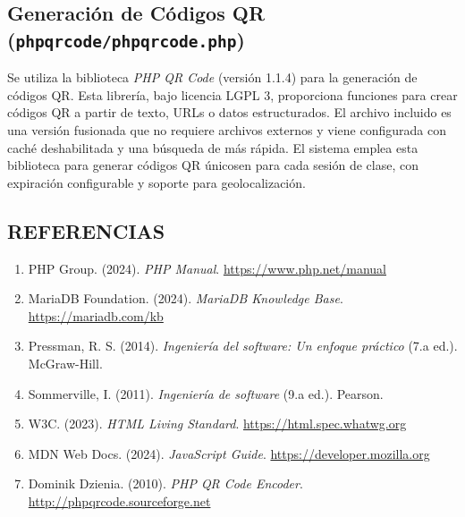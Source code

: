 \documentclass[12pt, letterpaper, oneside]{report}
\begin{document}
\subsection*{Generaci\'on de C\'odigos QR (\texttt{phpqrcode/phpqrcode.php})}

Se utiliza la biblioteca \textit{PHP QR Code} (versi\'on 1.1.4) para la generaci\'on de c\'odigos QR. Esta librer\'ia, bajo licencia LGPL 3, proporciona funciones para crear c\'odigos QR a partir de texto, URLs o datos estructurados. El archivo incluido es una versi\'on fusionada que no requiere archivos externos y viene configurada con caché deshabilitada y una b\'usqueda de m\'as rápida. El sistema emplea esta biblioteca para generar c\'odigos QR \'unicosen para cada sesi\'on de clase, con expiraci\'on configurable y soporte para geolocalizaci\'on.

\newpage

\pagestyle{body}
\begin{singlespace}

\section*{REFERENCIAS}

\begin{enumerate}
\item PHP Group. (2024). \textit{PHP Manual}. \url{https://www.php.net/manual}
\item MariaDB Foundation. (2024). \textit{MariaDB Knowledge Base}. \url{https://mariadb.com/kb}
\item Pressman, R. S. (2014). \textit{Ingenier\'ia del software: Un enfoque pr\'actico} (7.a ed.). McGraw-Hill.
\item Sommerville, I. (2011). \textit{Ingenier\'ia de software} (9.a ed.). Pearson.
\item W3C. (2023). \textit{HTML Living Standard}. \url{https://html.spec.whatwg.org}
\item MDN Web Docs. (2024). \textit{JavaScript Guide}. \url{https://developer.mozilla.org}
\item Dominik Dzienia. (2010). \textit{PHP QR Code Encoder}. \url{http://phpqrcode.sourceforge.net}
\end{enumerate}

\end{singlespace}
\end{document}
